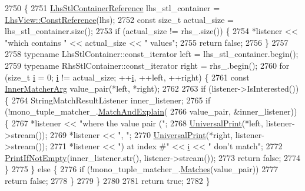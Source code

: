 \begin{DoxyCode}
2750                                                                       \{
2751       \hyperlink{classtesting_1_1internal_1_1PointwiseMatcher_1_1Impl_a9df3eb0866f76d59dbdd35fafeb5590c}{LhsStlContainerReference} lhs\_stl\_container = 
      \hyperlink{classtesting_1_1internal_1_1StlContainerView_a36eccf53329730f6e55c12002128bf25}{LhsView::ConstReference}(lhs);
2752       \textcolor{keyword}{const} \textcolor{keywordtype}{size\_t} actual\_size = lhs\_stl\_container.size();
2753       \textcolor{keywordflow}{if} (actual\_size != rhs\_.size()) \{
2754         *listener << \textcolor{stringliteral}{"which contains "} << actual\_size << \textcolor{stringliteral}{" values"};
2755         \textcolor{keywordflow}{return} \textcolor{keyword}{false};
2756       \}
2757 
2758       \textcolor{keyword}{typename} LhsStlContainer::const\_iterator left = lhs\_stl\_container.begin();
2759       \textcolor{keyword}{typename} RhsStlContainer::const\_iterator right = rhs\_.begin();
2760       \textcolor{keywordflow}{for} (\textcolor{keywordtype}{size\_t} \hyperlink{gtest__output__test__golden__lin_8txt_a7e98b8a17c0aad30ba64d47b74e2a6c1}{i} = 0; \hyperlink{gtest__output__test__golden__lin_8txt_a7e98b8a17c0aad30ba64d47b74e2a6c1}{i} != actual\_size; ++\hyperlink{gtest__output__test__golden__lin_8txt_a7e98b8a17c0aad30ba64d47b74e2a6c1}{i}, ++left, ++right) \{
2761         \textcolor{keyword}{const} \hyperlink{classtesting_1_1internal_1_1PointwiseMatcher_1_1Impl_aba9d983881cbfbb37724b8b40e863898}{InnerMatcherArg} value\_pair(*left, *right);
2762 
2763         \textcolor{keywordflow}{if} (listener->IsInterested()) \{
2764           StringMatchResultListener inner\_listener;
2765           \textcolor{keywordflow}{if} (!mono\_tuple\_matcher\_.\hyperlink{classtesting_1_1internal_1_1MatcherBase_ae3f5f3150a95cafb1c2ab7c864a42e65}{MatchAndExplain}(
2766                   value\_pair, &inner\_listener)) \{
2767             *listener << \textcolor{stringliteral}{"where the value pair ("};
2768             \hyperlink{namespacetesting_1_1internal_ad121a890bddf866e59605d1a0198dada}{UniversalPrint}(*left, listener->stream());
2769             *listener << \textcolor{stringliteral}{", "};
2770             \hyperlink{namespacetesting_1_1internal_ad121a890bddf866e59605d1a0198dada}{UniversalPrint}(*right, listener->stream());
2771             *listener << \textcolor{stringliteral}{") at index #"} << \hyperlink{gtest__output__test__golden__lin_8txt_a7e98b8a17c0aad30ba64d47b74e2a6c1}{i} << \textcolor{stringliteral}{" don't match"};
2772             \hyperlink{namespacetesting_1_1internal_a77c9e2b66d2b2414db4763971180d53c}{PrintIfNotEmpty}(inner\_listener.str(), listener->stream());
2773             \textcolor{keywordflow}{return} \textcolor{keyword}{false};
2774           \}
2775         \} \textcolor{keywordflow}{else} \{
2776           \textcolor{keywordflow}{if} (!mono\_tuple\_matcher\_.\hyperlink{classtesting_1_1internal_1_1MatcherBase_a105a9dae7afecee8898db8ad1887b0db}{Matches}(value\_pair))
2777             \textcolor{keywordflow}{return} \textcolor{keyword}{false};
2778         \}
2779       \}
2780 
2781       \textcolor{keywordflow}{return} \textcolor{keyword}{true};
2782     \}
\end{DoxyCode}


